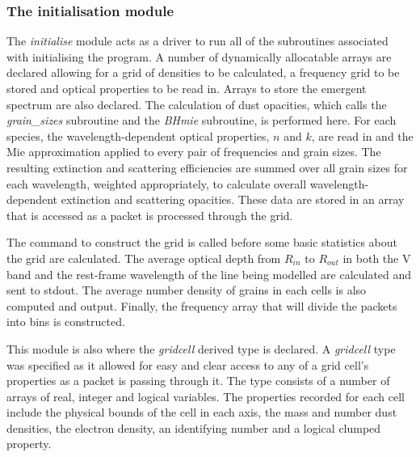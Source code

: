 		\subsubsection{The initialisation module}
		The \textit{initialise} module acts as a driver to run all of the subroutines associated with initialising the program.  A number of dynamically allocatable arrays are declared allowing for a grid of densities to be calculated, a frequency grid to be stored and optical properties to be read in.  Arrays to store the emergent spectrum are also declared.  The calculation of dust opacities, which calls the \textit{grain\_sizes} subroutine and the \textit{BHmie} subroutine, is performed here.  For each species, the wavelength-dependent optical properties, $n$ and $k$, are read in and the Mie approximation applied to every pair of frequencies and grain sizes.  The resulting extinction and scattering efficiencies are summed over all grain sizes for each wavelength, weighted appropriately, to calculate overall wavelength-dependent extinction and scattering opacities.  These data are stored in an array that is accessed as a packet is processed through the grid.   
		
		The command to construct the grid is called before some basic statistics about the grid are calculated.  The average optical depth from $R_{in}$ to $R_{out}$ in both the V band and the rest-frame wavelength of the line being modelled are calculated and sent to stdout.  The average number density of grains in each cells is also computed and output.  Finally, the frequency array that will divide the packets into bins is constructed.
		
		This module is also where the \textit{gridcell} derived type is declared.  A \textit{gridcell} type was specified as it allowed for easy and clear access to any of a grid cell's properties as a packet is passing through it.  The type consists of a number of arrays of real, integer and logical variables.  The properties recorded for each cell include the physical bounds of the cell in each axis, the mass and number dust densities,  the electron density, an identifying number  and a logical clumped property. 
		
